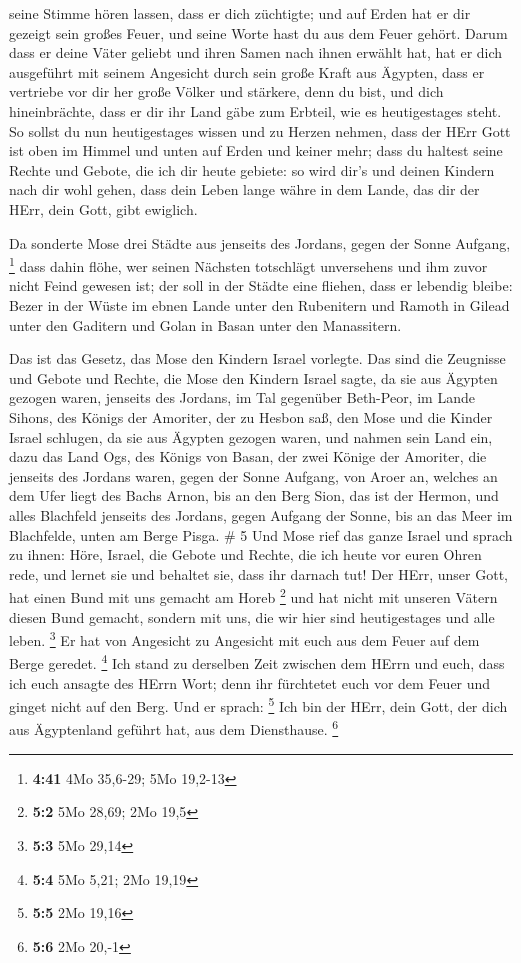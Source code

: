 seine Stimme hören lassen, dass er dich züchtigte; und auf Erden hat er
dir gezeigt sein großes Feuer, und seine Worte hast du aus dem Feuer
gehört.  Darum dass er deine Väter geliebt und ihren Samen
nach ihnen erwählt hat, hat er dich ausgeführt mit seinem Angesicht
durch sein große Kraft aus Ägypten,  dass er vertriebe vor
dir her große Völker und stärkere, denn du bist, und dich hineinbrächte,
dass er dir ihr Land gäbe zum Erbteil, wie es heutigestages steht.
 So sollst du nun heutigestages wissen und zu Herzen
nehmen, dass der HErr Gott ist oben im Himmel und unten auf Erden und
keiner mehr;  dass du haltest seine Rechte und Gebote, die
ich dir heute gebiete: so wird dir's und deinen Kindern nach dir wohl
gehen, dass dein Leben lange währe in dem Lande, das dir der HErr, dein
Gott, gibt ewiglich.

 Da sonderte Mose drei Städte aus jenseits des Jordans,
gegen der Sonne Aufgang, \footnote{\textbf{4:41} 4Mo 35,6-29; 5Mo
  19,2-13}  dass dahin flöhe, wer seinen Nächsten
totschlägt unversehens und ihm zuvor nicht Feind gewesen ist; der soll
in der Städte eine fliehen, dass er lebendig bleibe:  Bezer
in der Wüste im ebnen Lande unter den Rubenitern und Ramoth in Gilead
unter den Gaditern und Golan in Basan unter den Manassitern.

 Das ist das Gesetz, das Mose den Kindern Israel vorlegte.
 Das sind die Zeugnisse und Gebote und Rechte, die Mose den
Kindern Israel sagte, da sie aus Ägypten gezogen waren, 
jenseits des Jordans, im Tal gegenüber Beth-Peor, im Lande Sihons, des
Königs der Amoriter, der zu Hesbon saß, den Mose und die Kinder Israel
schlugen, da sie aus Ägypten gezogen waren,  und nahmen
sein Land ein, dazu das Land Ogs, des Königs von Basan, der zwei Könige
der Amoriter, die jenseits des Jordans waren, gegen der Sonne Aufgang,
 von Aroer an, welches an dem Ufer liegt des Bachs Arnon,
bis an den Berg Sion, das ist der Hermon,  und alles
Blachfeld jenseits des Jordans, gegen Aufgang der Sonne, bis an das Meer
im Blachfelde, unten am Berge Pisga. \# 5  Und Mose rief das
ganze Israel und sprach zu ihnen: Höre, Israel, die Gebote und Rechte,
die ich heute vor euren Ohren rede, und lernet sie und behaltet sie,
dass ihr darnach tut!  Der HErr, unser Gott, hat einen Bund
mit uns gemacht am Horeb \footnote{\textbf{5:2} 5Mo 28,69; 2Mo 19,5}
 und hat nicht mit unseren Vätern diesen Bund gemacht,
sondern mit uns, die wir hier sind heutigestages und alle leben.
\footnote{\textbf{5:3} 5Mo 29,14}  Er hat von Angesicht zu
Angesicht mit euch aus dem Feuer auf dem Berge geredet. \footnote{\textbf{5:4}
  5Mo 5,21; 2Mo 19,19}  Ich stand zu derselben Zeit zwischen
dem HErrn und euch, dass ich euch ansagte des HErrn Wort; denn ihr
fürchtetet euch vor dem Feuer und ginget nicht auf den Berg. Und er
sprach: \footnote{\textbf{5:5} 2Mo 19,16}  Ich bin der HErr,
dein Gott, der dich aus Ägyptenland geführt hat, aus dem Diensthause.
\footnote{\textbf{5:6} 2Mo 20,-1}

